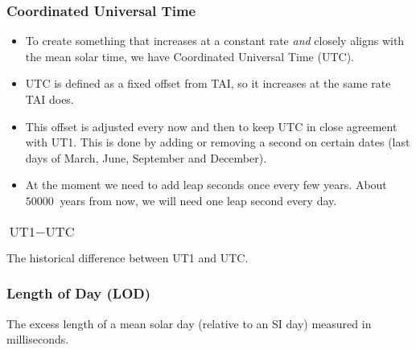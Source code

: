 \documentclass{beamer}
\begin{document}
\begin{frame}
  \frametitle{Coordinated Universal Time}

  \begin{itemize}
  \item To create something that increases at a constant rate \emph{and} closely
    aligns with the mean solar time, we have Coordinated Universal Time (UTC).
  \item UTC is defined as a fixed offset from TAI, so it increases at the same
    rate TAI does.
  \item This offset is adjusted every now and then to keep UTC in close
    agreement with UT1. This is done by adding or removing a second on certain
    dates (last days of March, June, September and December).
  \item At the moment we need to add leap seconds once every few years. About
    $\SI{50000}{}$ years from now, we will need one leap second every day.
  \end{itemize}
\end{frame}

\begin{frame}
  \frametitle{$\text{UT1} - \text{UTC}$}

  \begin{center}

    The historical difference between UT1 and UTC.
  \end{center}
\end{frame}

\begin{frame}
  \frametitle{Length of Day (LOD)}

  \begin{center}

    The excess length of a mean solar day (relative to an SI day) measured in
    milliseconds.
  \end{center}
\end{frame}
\end{document}
